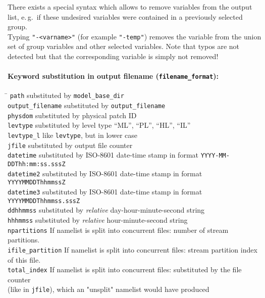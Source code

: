 \begin{note}
      There exists a special syntax which allows to remove variables from the output list, e.\,g.\ if
      these undesired variables were contained in a previously selected group.\\
      Typing \texttt{"-\textnormal{<varname>}"} (for example \texttt{"-temp"}) removes the
      variable from the union set of group variables and other selected variables.
      Note that typos are not detected but that the corresponding variable is
      simply not removed!
\end{note}

\paragraph{Keyword substitution in output filename (\texttt{filename\_format}):}
\begin{tabbing}
\hspace*{0.4\textwidth} \= \kill
\texttt{path}              \>  substituted by \texttt{model\_base\_dir}                    \\
\texttt{output\_filename}  \>  substituted by \texttt{output\_filename}                    \\
\texttt{physdom}           \>  substituted by physical patch ID                            \\
\texttt{levtype}           \>  substituted by level type ``ML'', ``PL'', ``HL'', ``IL''    \\
\texttt{levtype\_l}        \>  like \texttt{levtype}, but in lower case                    \\
\texttt{jfile}             \>  substituted by output file counter                          \\
\texttt{datetime}          \>  substituted by ISO-8601 date-time stamp in format \texttt{YYYY-MM-DDThh:mm:ss.sssZ} \\
\texttt{datetime2}         \>  substituted by ISO-8601 date-time stamp in format \texttt{YYYYMMDDThhmmssZ}         \\
\texttt{datetime3}         \>  substituted by ISO-8601 date-time stamp in format \texttt{YYYYMMDDThhmmss.sssZ}     \\
\texttt{ddhhmmss}          \>  substituted by \emph{relative} day-hour-minute-second string \\
\texttt{hhhmmss}           \>  substituted by \emph{relative} hour-minute-second string     \\
\texttt{npartitions}       \>  If namelist is split into concurrent files: number of stream partitions.           \\
\texttt{ifile\_partition}  \>  If namelist is split into concurrent files: stream partition index of this file.   \\
\texttt{total\_index}      \>  If namelist is split into concurrent files: substituted by the file counter \\ 
                           \>  (like in \texttt{jfile}), which an "unsplit" namelist would have produced
\end{tabbing}


